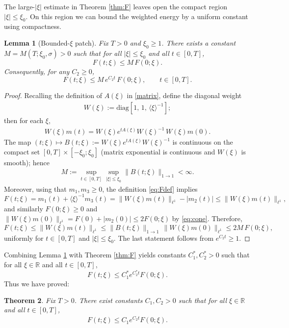 \documentclass{article}
\newcommand{\ang}[1]{\langle #1\rangle}
\def\R{\mathbb{R}}
\newtheorem{theorem}{Theorem}[section]
\newtheorem{lemma}[theorem]{Lemma}
\begin{document}
The large-$|\xi|$ estimate in Theorem \ref{thm:F} leaves open the compact region
$|\xi|\le \xi_0$. On this region we can bound the weighted energy by a
uniform constant using compactness.

\begin{lemma}[Bounded-$\xi$ patch]\label{lem:boundedPatch}
Fix $T>0$ and $\xi_0\ge 1$. There exists a constant $M=M(T;\xi_0,\sigma)>0$ such that
for all $|\xi|\le \xi_0$ and all $t\in[0,T]$,
\[
F(t;\xi)\le M\,F(0;\xi).
\]
Consequently, for any $C_2\ge 0$,
\[
F(t;\xi)\le M\,e^{C_2 t}\,F(0;\xi),\qquad t\in[0,T].
\]
\end{lemma}

\begin{proof}
Recalling the definition of $A(\xi)$ in \eqref{matrix}, define the diagonal weight
\begin{align*}
W(\xi):=\mathrm{diag }\left[1,\,1,\,\ang{\xi}^{-1}\right];
\end{align*}
then for each $\xi$,
\begin{align*}
W(\xi)m(t)=W(\xi)e^{tA(\xi)}W(\xi)^{-1}\,W(\xi)m(0).
\end{align*}
The map $(t;\xi)\mapsto B(t;\xi):=W(\xi)e^{tA(\xi)}W(\xi)^{-1}$ is continuous on the compact set
$[0,T]\times[-\xi_0;\xi_0]$ (matrix exponential is continuous and $W(\xi)$ is smooth); hence
\begin{align*}
M:=\sup_{t\in[0,T]}\sup_{|\xi|\le \xi_0}\|B(t;\xi)\|_{1\to 1}<\infty.
\end{align*}
Moreover, using that $m_1,m_3\ge 0$, the definition \eqref{eq:Fdef} implies
\[
F(t;\xi)=m_1(t)+\ang{\xi}^{-1}m_3(t)=\|W(\xi)m(t)\|_{\ell^1}-|m_2(t)|\le \|W(\xi)m(t)\|_{\ell^1},
\]
and similarly $F(0;\xi)\ge 0$ and $\|W(\xi)m(0)\|_{\ell^1}=F(0)+|m_2(0)|\le 2F(0;\xi)$ by \eqref{eq:cone}.
Therefore,
\[
F(t;\xi)\le \|W(\xi)m(t)\|_{\ell^1}
\le \|B(t;\xi)\|_{1\to 1}\,\|W(\xi)m(0)\|_{\ell^1}
\le 2M\,F(0;\xi),
\]
uniformly for $t\in[0,T]$ and $|\xi|\le \xi_0$.
The last statement follows from $e^{C_2 t}\ge 1$.
\end{proof}

Combining Lemma \ref{lem:boundedPatch} with Theorem \ref{thm:F} yields constants
$C_1^\ast,C_2^\ast>0$ such that for all $\xi\in\R$ and all $t\in[0,T]$,
\[
F(t;\xi)\le C_1^\ast e^{C_2^\ast t}F(0;\xi).
\]
Thus we have proved:

\begin{theorem}\label{thm:Global}
Fix $T>0$. There exist constants $C_1,C_2>0$ such that
for all $\xi \in \R$
and all $t\in[0,T]$,
\begin{align}\label{eq:F-finalGlobal}
F(t;\xi)\le C_1 e^{C_2 t}F(0;\xi).
\end{align}
\end{theorem}
\end{document}
